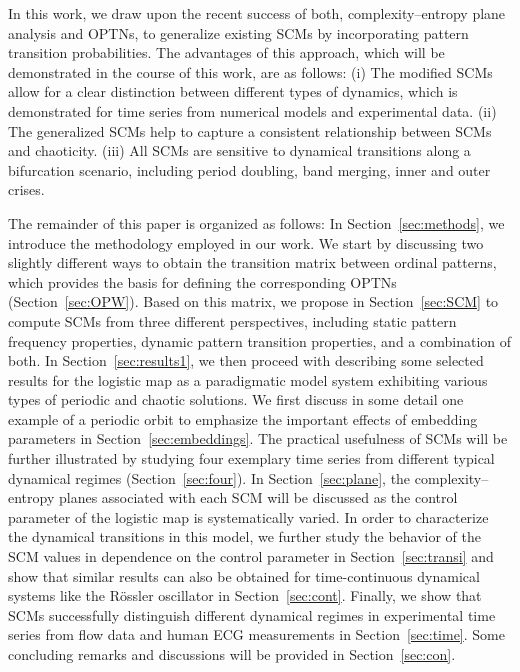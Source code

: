 \documentclass[aip,cha,reprint,nofootinbib]{revtex4-1}
\begin{document}
In this work, we draw upon the recent success of both, complexity--entropy plane analysis and OPTNs, to generalize  existing SCMs by incorporating pattern transition probabilities. The advantages of this approach, which will be demonstrated in the course of this work, are as follows: (i) The modified SCMs allow for a clear distinction between different types of dynamics, which is demonstrated for time series from numerical models and experimental data. (ii) The generalized SCMs help to capture a consistent relationship between SCMs and chaoticity. (iii) All SCMs are sensitive to dynamical transitions along a bifurcation scenario, including period doubling, band merging, inner and outer crises. 

The remainder of this paper is organized as follows: In Section~\ref{sec:methods}, we introduce the methodology employed in our work. We start by discussing two slightly different ways to obtain the transition matrix between ordinal patterns, which provides the basis for defining the corresponding OPTNs (Section~\ref{sec:OPW}). Based on this matrix, we propose in Section~\ref{sec:SCM} to compute SCMs from three different perspectives, including static pattern frequency properties, dynamic pattern transition properties, and a combination of both. In Section~\ref{sec:results1}, we then proceed with describing some selected results for the logistic map as a paradigmatic model system exhibiting various types of periodic and chaotic solutions. We first discuss in some detail one example of a periodic orbit to emphasize the important effects of embedding parameters in Section~\ref{sec:embeddings}. The practical usefulness of SCMs will be further illustrated by studying four exemplary time series from different typical dynamical regimes (Section~\ref{sec:four}). In Section~\ref{sec:plane}, the complexity--entropy planes associated with each SCM will be discussed as the control parameter of the logistic map is systematically varied. In order to characterize the dynamical transitions in this model, we further study the behavior of the SCM values in dependence on the control parameter in Section~\ref{sec:transi} and show that similar results can also be obtained for time-continuous dynamical systems like the R\"ossler oscillator in Section~\ref{sec:cont}. Finally, we show that SCMs successfully distinguish different dynamical regimes in experimental time series from flow data and human ECG measurements in Section~\ref{sec:time}. Some concluding remarks and discussions will be provided in Section~\ref{sec:con}.  
\end{document}
